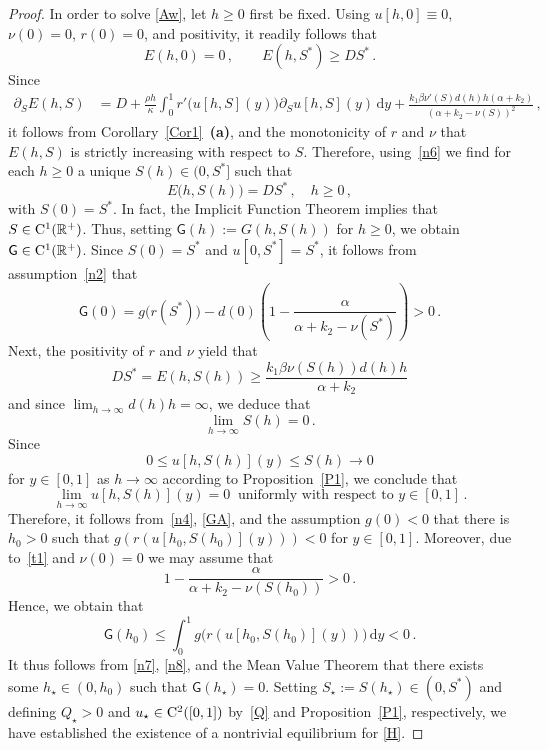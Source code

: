 \documentclass[reqno,11pt]{amsart}
\numberwithin{equation}{section}
\newcommand{\R}{\mathbb{R}}
\newcommand{\rd}{\mathrm{d}}
\begin{document}
\begin{proof}
In order to solve \eqref{Aw}, let $h\ge 0$ first be fixed. Using $u[h,0]\equiv 0$, $\nu(0)=0$, $r(0)=0$, and positivity, it readily follows that
\begin{equation}\label{n6}
E(h,0)=0\,,\qquad E(h,S^*)\ge  DS^*\,.
\end{equation}
Since 
\begin{align*}
\partial_SE(h,S)&=D+\frac{\rho h}{\kappa} \int_0^1  r'\bigl(u[h,S](y)\bigr) \partial_Su[h,S](y)\,\rd y+\frac{k_1\beta \nu'(S) d(h)h(\alpha+k_2)}{(\alpha+k_2-\nu(S))^2}\,,
\end{align*}
it follows from Corollary~\ref{Cor1}~{\bf (a)}, and the monotonicity of $r$ and $\nu$ that $E(h,S)$ is strictly increasing with respect to $S$. Therefore, using~\eqref{n6} we find for each $h\ge 0$  a unique $S(h)\in (0,S^*]$ such that
\begin{equation}\label{E}
E\big(h,S(h)\big)=DS^*\,,\quad h\ge 0\,,
\end{equation}
with $S(0)=S^*$. In fact, the Implicit Function Theorem implies that 
$S\in {\rm C}^1(\R^+)$. Thus, setting $\mathsf{G}(h):=G(h,S(h))$ for $h\ge 0$, we obtain $\mathsf{G}\in {\rm C}^1(\R^+)$. Since $S(0)=S^*$ and $u[0,S^*]=S^*$, it follows from assumption~\eqref{n2} that
\begin{equation}\label{n7}
\mathsf{G}(0)=  g\big(r(S^*)\big)-d(0)\left(1-\frac{\alpha}{\alpha+k_2-\nu(S^*)}\right)>0\,.
\end{equation}
Next, the positivity of $r$ and $\nu$ yield that
$$
DS^*=E(h,S(h))\ge  \frac{k_1\beta \nu(S(h)) d(h)h}{\alpha+k_2}
$$
and since $\lim_{h\to\infty} d(h)h=\infty$, we deduce that 
\begin{equation}\label{t1}
\lim_{h\to\infty} S(h)=0\,.
\end{equation} 
Since 
$$
0\le u[h,S(h)](y)\le S(h) \rightarrow 0 
$$
for $y\in [0,1]$ as  $h\rightarrow \infty$
according to Proposition~\ref{P1}, we  conclude that
\begin{equation}\label{n4}
\lim_{h\to\infty} u[h,S(h)](y)=0\ \text{ uniformly with respect to $y\in [0,1]$}\,.
\end{equation}
 Therefore, it follows from~\eqref{n4}, \eqref{GA}, and the assumption $g(0)<0$ that there is $h_0>0$ such that $g(r(u[h_0,S(h_0)](y)))<0$ for $y\in [0,1]$. Moreover, due to~\eqref{t1} and $\nu(0)=0$ we may assume that
$$
1-\frac{\alpha}{\alpha+k_2-\nu(S(h_0))}>0\,.
$$
Hence, we obtain that
\begin{equation}\label{n8}
\mathsf{G}(h_0)\le \int_0^{1} g\big(r(u[h_0,S(h_0)](y))\big)\,\rd y <0\,.
\end{equation}
It thus follows from \eqref{n7}, \eqref{n8}, and the Mean Value Theorem that there exists some $h_\star\in (0,h_0)$ such that $\mathsf{G}(h_\star)=0$. Setting $S_\star:=S(h_\star)\in (0,S^*)$ and defining $Q_\star>0$  and $u_\star\in {\rm C}^2([0,1])$ by~\eqref{Q} and Proposition~\ref{P1}, respectively, we have established the existence of a nontrivial equilibrium for \eqref{H}.
\end{proof}
\end{document}
